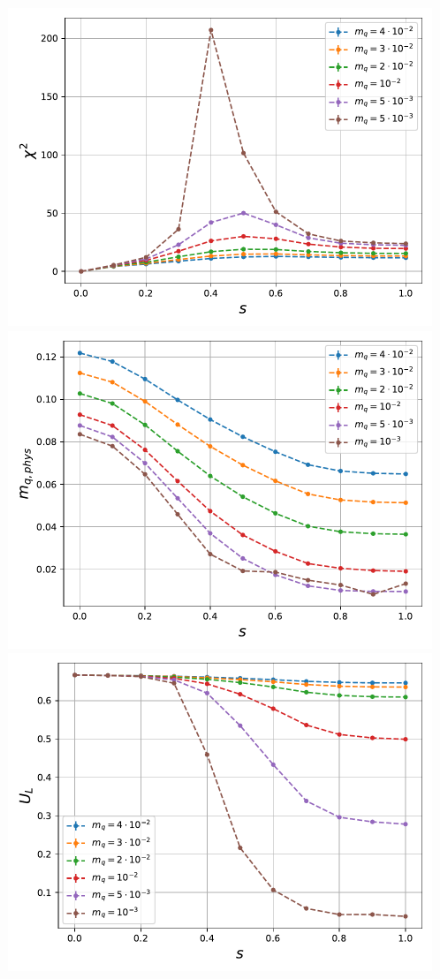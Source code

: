 \begin{figure}[h]
\begin{minipage}{0.45\textwidth}
	\includegraphics[scale=0.48]{figures/chiral_PT/susceptibility.pdf}
\end{minipage}
\hfill
\begin{minipage}{0.45\textwidth}	
	\includegraphics[scale=0.48]{figures/chiral_PT/mqphys.pdf}
\end{minipage}
\hfill
\begin{minipage}{0.45\textwidth}
	\includegraphics[scale=0.48]{figures/chiral_PT/binder.pdf}

\end{minipage}
\end{figure}

